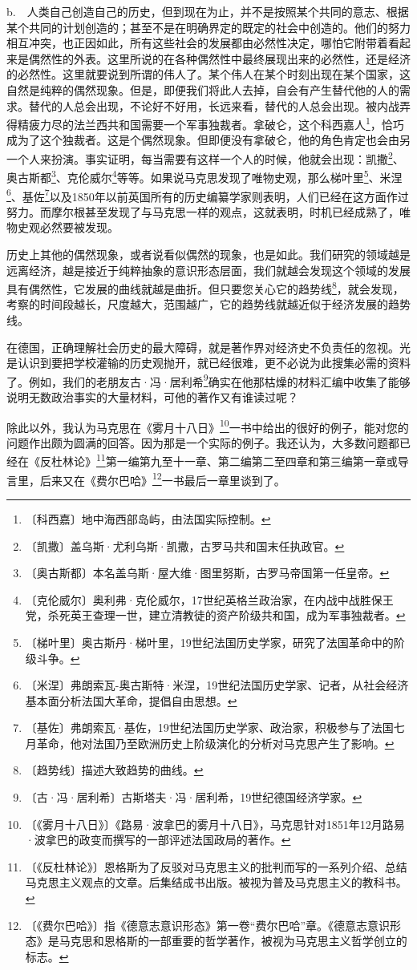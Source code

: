 \documentclass[12pt,UTF-8,openany]{ctexbook}
\begin{document}
\begin{normalsize}
    b.~~人类自己创造自己的历史，但到现在为止，并不是按照某个共同的意志、根据某个共同的计划创造的；甚至不是在明确界定的既定的社会中创造的。他们的努力相互冲突，也正因如此，所有这些社会的发展都由必然性决定，哪怕它附带着看起来是偶然性的外表。这里所说的在各种偶然性中最终展现出来的必然性，还是经济的必然性。这里就要说到所谓的伟人了。某个伟人在某个时刻出现在某个国家，这自然是纯粹的偶然现象。但是，即便我们将此人去掉，自会有产生替代他的人的需求。替代的人总会出现，不论好不好用，长远来看，替代的人总会出现。被内战弄得精疲力尽的法兰西共和国需要一个军事独裁者。拿破仑，这个科西嘉人\footnote{〔科西嘉〕地中海西部岛屿，由法国实际控制。}，恰巧成为了这个独裁者。这是个偶然现象。但即便没有拿破仑，他的角色肯定也会由另一个人来扮演。事实证明，每当需要有这样一个人的时候，他就会出现：凯撒\footnote{〔凯撒〕盖乌斯·尤利乌斯·凯撒，古罗马共和国末任执政官。}、奥古斯都\footnote{〔奥古斯都〕本名盖乌斯·屋大维·图里努斯，古罗马帝国第一任皇帝。}、克伦威尔\footnote{〔克伦威尔〕奥利弗·克伦威尔，17世纪英格兰政治家，在内战中战胜保王党，杀死英王查理一世，建立清教徒的资产阶级共和国，成为军事独裁者。}等等。如果说马克思发现了唯物史观，那么梯叶里\footnote{〔梯叶里〕奥古斯丹·梯叶里，19世纪法国历史学家，研究了法国革命中的阶级斗争。}、米涅\footnote{〔米涅〕弗朗索瓦-奥古斯特·米涅，19世纪法国历史学家、记者，从社会经济基本面分析法国大革命，提倡自由思想。}、基佐\footnote{〔基佐〕弗朗索瓦·基佐，19世纪法国历史学家、政治家，积极参与了法国七月革命，他对法国乃至欧洲历史上阶级演化的分析对马克思产生了影响。}以及1850年以前英国所有的历史编纂学家则表明，人们已经在这方面作过努力。而摩尔根甚至发现了与马克思一样的观点，这就表明，时机已经成熟了，唯物史观必然要被发现。
    
    历史上其他的偶然现象，或者说看似偶然的现象，也是如此。我们研究的领域越是远离经济，越是接近于纯粹抽象的意识形态层面，我们就越会发现这个领域的发展具有偶然性，它发展的曲线就越是曲折。但只要您关心它的趋势线\footnote{〔趋势线〕描述大致趋势的曲线。}，就会发现，考察的时间段越长，尺度越大，范围越广，它的趋势线就越近似于经济发展的趋势线。
    
    在德国，正确理解社会历史的最大障碍，就是著作界对经济史不负责任的忽视。光是认识到要把学校灌输的历史观抛开，就已经很难，更不必说为此搜集必需的资料了。例如，我们的老朋友古·冯·居利希\footnote{〔古·冯·居利希〕古斯塔夫·冯·居利希，19世纪德国经济学家。}确实在他那枯燥的材料汇编中收集了能够说明无数政治事实的大量材料，可他的著作又有谁读过呢？
    
    除此以外，我认为马克思在《雾月十八日》\footnote{〔《雾月十八日》〕《路易·波拿巴的雾月十八日》，马克思针对1851年12月路易·波拿巴的政变而撰写的一部评述法国政局的著作。}一书中给出的很好的例子，能对您的问题作出颇为圆满的回答。因为那是一个实际的例子。我还认为，大多数问题都已经在《反杜林论》\footnote{〔《反杜林论》〕恩格斯为了反驳对马克思主义的批判而写的一系列介绍、总结马克思主义观点的文章。后集结成书出版。被视为普及马克思主义的教科书。}第一编第九至十一章、第二编第二至四章和第三编第一章或导言里，后来又在《费尔巴哈》\footnote{〔《费尔巴哈》〕指《德意志意识形态》第一卷“费尔巴哈”章。《德意志意识形态》是马克思和恩格斯的一部重要的哲学著作，被视为马克思主义哲学创立的标志。}一书最后一章里谈到了。
    

\end{normalsize}
\end{document}
